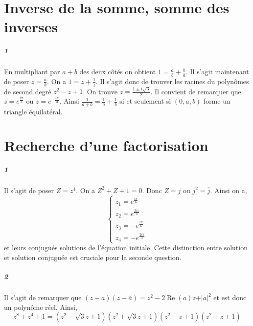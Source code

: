 \documentclass[10pt,a4paper]{article}
\begin{document}
\section{Inverse de la somme, somme des inverses}
\subparagraph{1} En multipliant par $a+b$ des deux côtés on obtient $1 = \frac{a}{b} + \frac{b}{a}$. Il s'agit maintenant de poser $z = \frac{a}{b}$. On a $1 = z + \frac{1}{z}$. Il s'agit donc de trouver les racines du polynômes de second degré $z^2 -z +1$. On trouve $z = \frac{1 \pm i \sqrt{3}}{2}$. Il convient de remarquer que $z = e^{\frac{i\pi}{3}}$ ou $z= e^{-\frac{i\pi}{3}}$. Ainsi $\frac{1}{a+b} = \frac{1}{a}+ \frac{1}{b}$ si et seulement si $(0,a,b)$ forme un triangle équilatéral.

\section{Recherche d'une factorisation}
\subparagraph{1}Il s'agit de poser $Z = z^4$. On a $Z^2+Z+1=0$. Donc $Z = j$ ou $j^2 = \overline{j}$. Ainsi on a,
\begin{equation}
\left\lbrace
\begin{aligned}
z_1 = e^{\frac{i\pi}{6}} \\ 
z_2 = e^{\frac{2i\pi}{3}} \\
z_3 = -e^{\frac{i\pi}{6}} \\
z_4 = -e^{\frac{2i\pi}{3}}
\end{aligned}
\right.
\end{equation}
et leurs conjugués solutions de l'équation initiale. Cette distinction entre solution et solution conjuguée est cruciale pour la seconde question.
\subparagraph{2}Il s'agit de remarquer que $(z-a)(z-\overline{a}) = z^2 - 2\operatorname{Re}(a) z + \vert a \vert^2$ et est donc un polynôme réel. Ainsi, 
\begin{equation}
z^8 +z^4 +1 = (z^2- \sqrt{3}z+1)(z^2 + \sqrt{3}z +1)(z^2-z+1)(z^2+z+1)
\end{equation}
\end{document}
